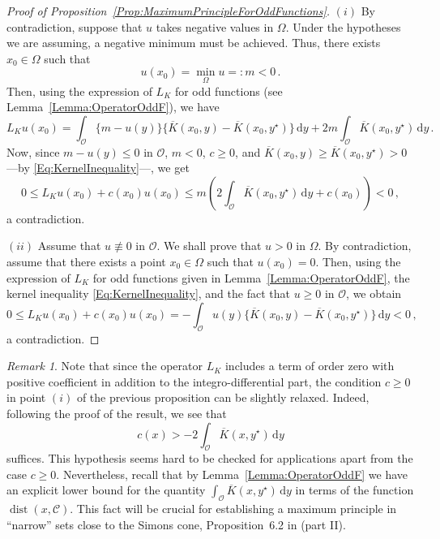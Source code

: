 \documentclass[12pt,reqno]{amsart}
\theoremstyle{definition}
\theoremstyle{remark}
\newtheorem{remark}[theorem]{Remark}
\newcommand{\ccal}{\mathscr{C}}
\newcommand{\ocal}{\mathcal{O}}
\renewcommand{\d}{\,\mathrm{d}} %
\DeclareMathOperator{\dist}{dist}
\numberwithin{equation}{section}
\begin{document}
\begin{proof}[Proof of Proposition~\ref{Prop:MaximumPrincipleForOddFunctions}]
	$(i)$ By contradiction, suppose that $u$ takes negative values in $\Omega$. Under the hypotheses we are assuming, a negative minimum must be achieved. Thus, there exists $x_0\in \Omega$ such that
	$$
	u(x_0) = \min_{\Omega} u =: m < 0\,.
	$$
	Then, using the expression of $L_K$ for odd functions (see Lemma~\ref{Lemma:OperatorOddF}), we have
	$$
	L_K u (x_0) = \int_{\ocal} \{m - u(y) \} \{\overline{K}(x_0, y) - \overline{K}(x_0, y^\star)  \} \d y +  2 m \int_{\ocal} \overline{K}(x_0, y^\star) \d y\,.
	$$
	Now, since $m - u(y) \leq 0$ in $\ocal$, $m<0$, $c\geq 0$, and $\overline{K}(x_0, y) \geq \overline{K}(x_0, y^\star)>0$ ---by \eqref{Eq:KernelInequality}---, we get
	$$
	0 \leq L_K  u(x_0) + c(x_0) u(x_0) \leq m \left(2\int_{\ocal} \overline{K}(x_0, y^\star) \d y + c(x_0)\right)  < 0\,,
	$$
	a contradiction.
	
	$(ii)$ 
	Assume that $u \not \equiv 0$ in $\ocal$. We shall prove that $u > 0$ in $\Omega$. By contradiction, assume that there exists a point $x_0\in \Omega$ such that $u(x_0)= 0$. Then, using the expression of $L_K $ for odd functions given in Lemma~\ref{Lemma:OperatorOddF}, the kernel inequality \eqref{Eq:KernelInequality}, and the fact that $u\geq 0$ in $\ocal$, we obtain
	$$
	0 \leq L_K u(x_0) + c(x_0) u(x_0) = - \int_{\ocal} u(y)\big \{\overline{K}(x_0, y) - \overline{K}(x_0, y^\star) \big \}\d y < 0\,,
	$$
	a contradiction.
\end{proof}

\begin{remark}
	Note that since the operator $L_K$ includes a term of order zero with positive coefficient in addition to the integro-differential part, the condition $c\geq 0$ in point $(i)$ of the previous proposition can be slightly relaxed. Indeed, following the proof of the result, we see that
	$$ c(x) > -2\int_{\ocal} \overline{K}(x, y^\star) \d y $$
	suffices.
	This hypothesis seems hard to be checked for applications apart from the case $c\geq 0$. Nevertheless, recall that by Lemma~\ref{Lemma:OperatorOddF} we have an explicit lower bound for the quantity $ \int_{\ocal} \overline{K}(x, y^\star) \d y $ in terms of the function $\dist(x,\ccal)$. This fact will be crucial for establishing a maximum principle in ``narrow'' sets close to the Simons cone, Proposition~6.2 in \cite{FelipeSanz-Perela:IntegroDifferentialII} (part II).
\end{remark}


\end{document}
